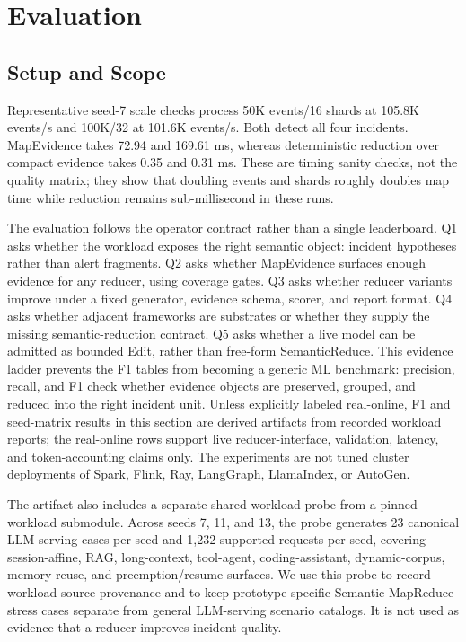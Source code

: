 \documentclass[sigplan,anonymous,nonacm]{acmart}
\newcommand{\systemname}{Semantic MapReduce}
\begin{document}
\section{Evaluation}

\subsection{Setup and Scope}

Representative seed-7 scale checks process 50K events/16 shards at 105.8K events/s and 100K/32 at 101.6K events/s. Both detect all four incidents. \textsf{MapEvidence} takes 72.94 and 169.61 ms, whereas deterministic reduction over compact evidence takes 0.35 and 0.31 ms. These are timing sanity checks, not the quality matrix; they show that doubling events and shards roughly doubles map time while reduction remains sub-millisecond in these runs.

The evaluation follows the operator contract rather than a single leaderboard. Q1 asks whether the workload exposes the right semantic object: incident hypotheses rather than alert fragments. Q2 asks whether \textsf{MapEvidence} surfaces enough evidence for any reducer, using coverage gates. Q3 asks whether reducer variants improve under a fixed generator, evidence schema, scorer, and report format. Q4 asks whether adjacent frameworks are substrates or whether they supply the missing semantic-reduction contract. Q5 asks whether a live model can be admitted as bounded \textsf{Edit}, rather than free-form \textsf{SemanticReduce}. This evidence ladder prevents the F1 tables from becoming a generic ML benchmark: precision, recall, and F1 check whether evidence objects are preserved, grouped, and reduced into the right incident unit. Unless explicitly labeled real-online, F1 and seed-matrix results in this section are derived artifacts from recorded workload reports; the real-online rows support live reducer-interface, validation, latency, and token-accounting claims only. The experiments are not tuned cluster deployments of Spark, Flink, Ray, LangGraph, LlamaIndex, or AutoGen.

The artifact also includes a separate shared-workload probe from a pinned workload submodule. Across seeds 7, 11, and 13, the probe generates 23 canonical LLM-serving cases per seed and 1,232 supported requests per seed, covering session-affine, RAG, long-context, tool-agent, coding-assistant, dynamic-corpus, memory-reuse, and preemption/resume surfaces. We use this probe to record workload-source provenance and to keep prototype-specific \systemname{} stress cases separate from general LLM-serving scenario catalogs. It is not used as evidence that a reducer improves incident quality.
\end{document}
